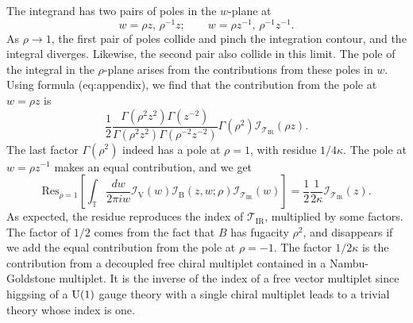 The integrand has two pairs of poles in the $w$-plane at
\begin{equation}
    w  =  \rho z,  \,  \rho^{-1}z;  
    \quad\quad  
    w  =  \rho z^{-1},  \,  \rho^{-1}z^{-1}.
\end{equation}
 As $\rho\rightarrow1$, the first pair of poles collide and pinch
the integration contour, and the integral diverges. Likewise, the
second pair also collide in this limit. The pole of the integral in
the $\rho$-plane arises from the contributions from these poles in
$w$. Using formula (eq:appendix), we find that the contribution from
the pole at $w=\rho z$ is 
\begin{equation}
    \frac{1}{2}\frac{\Gamma(\rho^{2}z^{2})\Gamma(z^{-2})}{\Gamma(\rho^{2}z^{2})\Gamma(\rho^{-2}z^{-2})}
    \Gamma(\rho^{2})
    \mathcal{I}_{\mathcal{T}_{\mathrm{IR}}}(\rho z).
\end{equation}
 The last factor $\Gamma(\rho^{2})$ indeed has a pole at $\rho=1$,
with residue $1/4\kappa$. The pole at $w=\rho z^{-1}$ makes an equal
contribution, and we get
\begin{equation}
    \mathrm{Res}_{\rho=1}
    \left[
      \int_{\mathbb{T}}\frac{dw}{2\pi iw}
      \mathcal{I}_{\mathrm{V}}(w)
      \mathcal{I}_{\mathrm{B}}(z,w;\rho)
      \mathcal{I}_{\mathcal{T}_{\mathrm{IR}}}(w)
    \right]  
      =  
        \frac{1}{2}  \frac{1}{2\kappa}
        \mathcal{I}_{\mathcal{T}_{\mathrm{IR}}}(z).
\end{equation}
As expected, the residue reproduces the index of $\mathcal{T}_{\mathrm{IR}}$,
multiplied by some factors. The factor of $1/2$ comes from the fact
that $B$ has fugacity $\rho^{2}$, and disappears if we add the equal
contribution from the pole at $\rho=-1$. The factor $1/2\kappa$
is the contribution from a decoupled free chiral multiplet contained
in a Nambu-Goldstone multiplet. It is the inverse of the index of
a free vector multiplet since higgsing of a $\mathrm{U}(1)$ gauge theory with
a single chiral multiplet leads to a trivial theory whose index is
one. 


